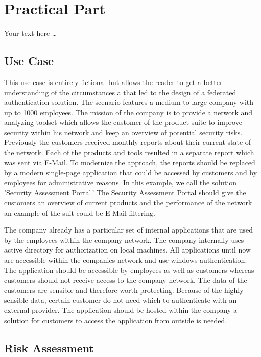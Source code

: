 \chapter{Practical Part}\label{chap:practicalPart}
\chapterstart

Your text here \ldots
\section{Use Case}
This use case is entirely fictional but allows the reader to get a better understanding of the circumstances a that led to the design of a federated authentication solution. The scenario features a medium to large company with up to 1000 employees. The mission of the company is to provide a network and analyzing toolset which allows the customer of the product suite to improve security within his network and keep an overview of potential security risks. Previously the customers received monthly reports about their current state of the network. Each of the products and tools resulted in a separate report which was sent via E-Mail. To modernize the approach, the reports should be replaced by a modern single-page application that could be accessed by customers and by employees for administrative reasons. In this example, we call the solution 'Security Assessment Portal.' The Security Assessment Portal should give the customers an overview of current products and the performance of the network an example of the suit could be E-Mail-filtering.  

The company already has a particular set of internal applications that are used by the employees within the company network. The company internally uses active directory for authorization on local machines. All applications until now are accessible within the companies network and use windows authentication. The application should be accessible by employees as well as customers whereas customers should not receive access to the company network. The data of the customers are sensible and therefore worth protecting. Because of the highly sensible data, certain customer do not need which to authenticate with an external provider. The application should be hosted within the company a solution for customers to access the application from outside is needed.


\section{Risk Assessment}



